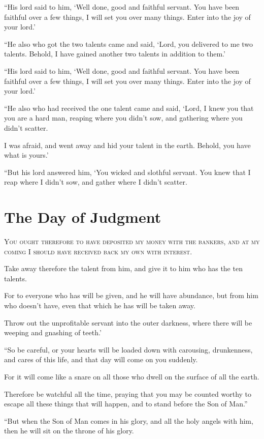 “His lord said to him, ‘Well done, good and faithful servant. You have been faithful over a few things, I will set you over many things. Enter into the joy of your lord.’

“He also who got the two talents came and said, ‘Lord, you delivered to me two talents. Behold, I have gained another two talents in addition to them.’

“His lord said to him, ‘Well done, good and faithful servant. You have been faithful over a few things, I will set you over many things. Enter into the joy of your lord.’

“He also who had received the one talent came and said, ‘Lord, I knew you that you are a hard man, reaping where you didn’t sow, and gathering where you didn’t scatter.

I was afraid, and went away and hid your talent in the earth. Behold, you have what is yours.’

“But his lord answered him, ‘You wicked and slothful servant. You knew that I reap where I didn’t sow, and gather where I didn’t scatter.


\clearpage \section*{The Day of Judgment}

\lettrine{Y}{ou ought therefore to have deposited my money with the bankers, and at my coming I should have received back my own with interest.}

Take away therefore the talent from him, and give it to him who has the ten talents.

For to everyone who has will be given, and he will have abundance, but from him who doesn’t have, even that which he has will be taken away.

Throw out the unprofitable servant into the outer darkness, where there will be weeping and gnashing of teeth.’

“So be careful, or your hearts will be loaded down with carousing, drunkenness, and cares of this life, and that day will come on you suddenly.

For it will come like a snare on all those who dwell on the surface of all the earth.

Therefore be watchful all the time, praying that you may be counted worthy to escape all these things that will happen, and to stand before the Son of Man.”

“But when the Son of Man comes in his glory, and all the holy angels with him, then he will sit on the throne of his glory.

